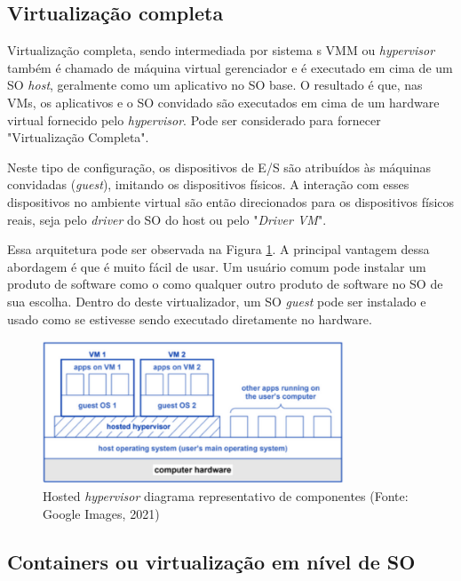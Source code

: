\subsection{Virtualização completa}

Virtualização completa, sendo intermediada por sistema s VMM ou \emph{hypervisor} também é chamado de máquina virtual gerenciador e é executado em cima de um SO \emph{host}, geralmente como um aplicativo no SO base. O resultado é que, nas VMs, os aplicativos e o SO convidado são executados em cima de um hardware virtual fornecido pelo \emph{hypervisor}. Pode ser considerado para fornecer "Virtualização Completa".

Neste tipo de configuração, os dispositivos de E/S são atribuídos às máquinas convidadas (\emph{guest}), imitando os dispositivos físicos. A interação com esses dispositivos no ambiente virtual são então direcionados para os dispositivos físicos reais, seja pelo \emph{driver} do SO do host ou pelo "\emph{Driver VM}". 

Essa arquitetura pode ser observada na Figura \ref{fig:vms}. A principal vantagem dessa abordagem é que é muito fácil de usar. Um usuário comum pode instalar um produto de software como o  como qualquer outro produto de software no SO de sua escolha. Dentro do deste virtualizador, um SO \emph{guest} pode ser instalado e usado como se estivesse sendo executado diretamente no hardware. \cite{portnoy2012virtualization}

\begin{figure}[!h]
    \centering
    \includegraphics[width=0.8\textwidth]{04-figuras/vms.png}
    \caption{Hosted \emph{hypervisor} diagrama representativo de componentes (Fonte: Google Images, 2021)}
    \label{fig:vms}
\end{figure}

\subsection{Containers ou virtualização em nível de SO}

